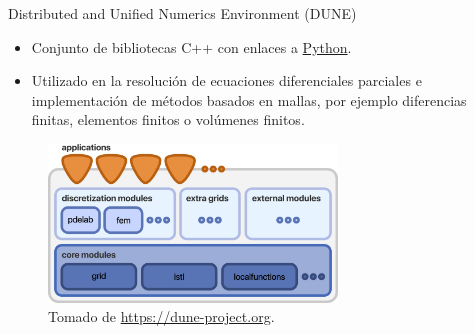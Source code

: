 \begin{frame}
\begin{alertblock}{Distributed and Unified Numerics Environment (DUNE)}
\begin{itemize}
			\item

			      Conjunto de bibliotecas C++ con enlaces a \href{https://pypi.org/search/?q=dune-}{Python}.


			\item

			      Utilizado en la resolución de ecuaciones diferenciales parciales e implementación de métodos basados en mallas, por ejemplo diferencias finitas, elementos finitos o volúmenes finitos.
		\end{itemize}
	\end{alertblock}

	\begin{figure}[ht!]
		\centering
		\includegraphics[height=4.2cm]{dunedesign}
		\caption{Tomado de \url{https://dune-project.org}.}
	\end{figure}

\end{frame}

